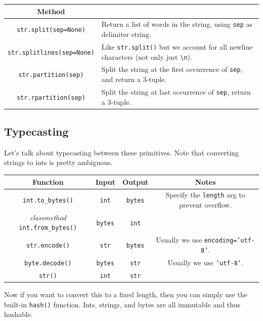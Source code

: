     \begin{definition}
      \label{def:split-and-partition}
      \begin{table}[H]
        \centering
        \begin{tabular}{|c|p{8cm}|}
          \hline
          \textbf{Method} & \textbf{} \\
          \hline
          \texttt{str.split(sep=None)} & Return a list of words in the string, using \texttt{sep} as delimiter string. \\ 
          \texttt{str.splitlines(sep=None)} & Like \texttt{str.split()} but we account for all newline characters (not only just \texttt{\textbackslash n}). \\ 
          \texttt{str.partition(sep)} & Split the string at the first occurrence of \texttt{sep}, and return a 3-tuple. \\ 
          \texttt{str.rpartition(sep)} & Split the string at last occurrence of \texttt{sep}, return a 3-tuple. \\  
          \hline
        \end{tabular}
      \end{table}
    \end{definition} 

\subsection{Typecasting}

  Let's talk about typecasting between these primitives. Note that converting strings to ints is pretty ambiguous. 

  \begin{table}[H]
    \centering
    \begin{tabular}{|c|c|c|c|}
      \hline
      \textbf{Function} & \textbf{Input} & \textbf{Output} & \textbf{Notes} \\
      \hline
      \texttt{int.to\_bytes()} & \texttt{int} & \texttt{bytes} & Specify the \texttt{length} arg to prevent overflow. \\ 
      \textit{classmethod} \texttt{int.from\_bytes()} & \texttt{bytes} & \texttt{int} & \\
      \texttt{str.encode()} & \texttt{str} & \texttt{bytes} & Usually we use \texttt{encoding='utf-8'}. \\  
      \texttt{byte.decode()} & \texttt{bytes} & \texttt{str} & Usually we use \texttt{'utf-8'}. \\  
      \texttt{str()} & \texttt{int} & \texttt{str} & \\ 
      \hline
    \end{tabular} 
  \end{table}

  Now if you want to convert this to a fixed length, then you can simply use the built-in \texttt{hash()} function. Ints, strings, and bytes are all immutable and thus hashable. 

